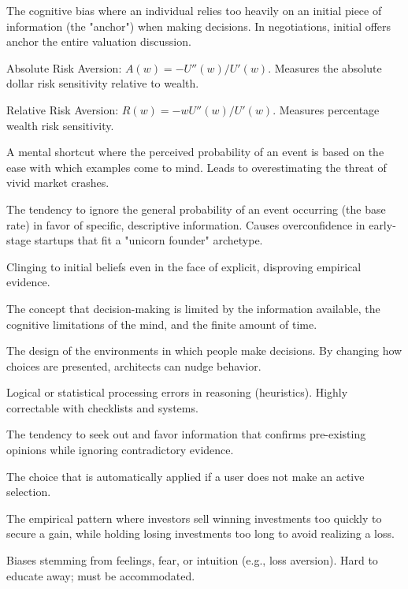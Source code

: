 \documentclass[11pt,a4paper]{article}
\begin{document}
\begin{description}[leftmargin=1.5cm, labelindent=0.5cm]
    \item[Anchoring] The cognitive bias where an individual relies too heavily on an initial piece of information (the "anchor") when making decisions. In negotiations, initial offers anchor the entire valuation discussion.
    \item[Arrow-Pratt ARA] Absolute Risk Aversion: $A(w) = -U''(w)/U'(w)$. Measures the absolute dollar risk sensitivity relative to wealth.
    \item[Arrow-Pratt RRA] Relative Risk Aversion: $R(w) = -w U''(w)/U'(w)$. Measures percentage wealth risk sensitivity.
    \item[Availability Heuristic] A mental shortcut where the perceived probability of an event is based on the ease with which examples come to mind. Leads to overestimating the threat of vivid market crashes.
    \item[Base-Rate Fallacy] The tendency to ignore the general probability of an event occurring (the base rate) in favor of specific, descriptive information. Causes overconfidence in early-stage startups that fit a "unicorn founder" archetype.
    \item[Belief Perseverance] Clinging to initial beliefs even in the face of explicit, disproving empirical evidence.
    \item[Bounded Rationality] The concept that decision-making is limited by the information available, the cognitive limitations of the mind, and the finite amount of time.
    \item[Choice Architecture] The design of the environments in which people make decisions. By changing how choices are presented, architects can nudge behavior.
    \item[Cognitive Bias] Logical or statistical processing errors in reasoning (heuristics). Highly correctable with checklists and systems.
    \item[Confirmation Bias] The tendency to seek out and favor information that confirms pre-existing opinions while ignoring contradictory evidence.
    \item[Default Option] The choice that is automatically applied if a user does not make an active selection.
    \item[Disposition Effect] The empirical pattern where investors sell winning investments too quickly to secure a gain, while holding losing investments too long to avoid realizing a loss.
    \item[Emotional Bias] Biases stemming from feelings, fear, or intuition (e.g., loss aversion). Hard to educate away; must be accommodated.

\end{description}
\end{document}
